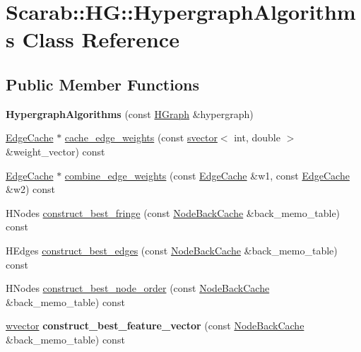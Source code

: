 \hypertarget{classScarab_1_1HG_1_1HypergraphAlgorithms}{
\section{Scarab::HG::HypergraphAlgorithms Class Reference}
\label{classScarab_1_1HG_1_1HypergraphAlgorithms}
}
\subsection*{Public Member Functions}
\begin{DoxyCompactItemize}
\item 
\hypertarget{classScarab_1_1HG_1_1HypergraphAlgorithms_a71e2da9111a9a484e5ef370991fdb6aa}{
{\bfseries HypergraphAlgorithms} (const \hyperlink{classScarab_1_1HG_1_1HGraph}{HGraph} \&hypergraph)}
\label{classScarab_1_1HG_1_1HypergraphAlgorithms_a71e2da9111a9a484e5ef370991fdb6aa}

\item 
\hyperlink{classCache}{EdgeCache} $\ast$ \hyperlink{classScarab_1_1HG_1_1HypergraphAlgorithms_a28f83d7616f6153ca7c909fe82c5b0fa}{cache\_\-edge\_\-weights} (const \hyperlink{classsvector}{svector}$<$ int, double $>$ \&weight\_\-vector) const 
\item 
\hyperlink{classCache}{EdgeCache} $\ast$ \hyperlink{classScarab_1_1HG_1_1HypergraphAlgorithms_ae815dc19968e9ab557d19dd2563fca38}{combine\_\-edge\_\-weights} (const \hyperlink{classCache}{EdgeCache} \&w1, const \hyperlink{classCache}{EdgeCache} \&w2) const 
\item 
HNodes \hyperlink{classScarab_1_1HG_1_1HypergraphAlgorithms_af5bcb325e1d58dd9d4c26517c4dfeca0}{construct\_\-best\_\-fringe} (const \hyperlink{classCache}{NodeBackCache} \&back\_\-memo\_\-table) const 
\item 
HEdges \hyperlink{classScarab_1_1HG_1_1HypergraphAlgorithms_ab054762a5d6a0af7ee667c8e90585668}{construct\_\-best\_\-edges} (const \hyperlink{classCache}{NodeBackCache} \&back\_\-memo\_\-table) const 
\item 
HNodes \hyperlink{classScarab_1_1HG_1_1HypergraphAlgorithms_acf3eea6f89752404f12c0a3dd45d397d}{construct\_\-best\_\-node\_\-order} (const \hyperlink{classCache}{NodeBackCache} \&back\_\-memo\_\-table) const 
\item 
\hypertarget{classScarab_1_1HG_1_1HypergraphAlgorithms_a4ff84fd293173b5cee2f902a3509a5c2}{
\hyperlink{classsvector}{wvector} {\bfseries construct\_\-best\_\-feature\_\-vector} (const \hyperlink{classCache}{NodeBackCache} \&back\_\-memo\_\-table) const }
\label{classScarab_1_1HG_1_1HypergraphAlgorithms_a4ff84fd293173b5cee2f902a3509a5c2}


\end{DoxyCompactItemize}
